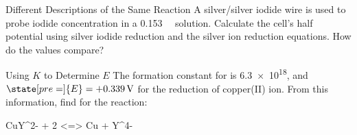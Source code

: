 \documentclass[notes=show]{beamer}
\begin{document}

%

\begin{frame}[t]{Different Descriptions of the Same Reaction}
	A silver/silver iodide wire is used to probe iodide concentration in a
	\SI{0.153}{\milli\Molar}  solution.  Calculate the cell's half
	potential  using silver iodide reduction and the silver ion reduction
	equations.  How do the values compare?

\end{frame}

\clearpage

\begin{frame}[t]{Using $K$ to Determine $E$}
	The formation constant for  is \num{6.3e18}, and
	$\state[pre=]{E} = \SI[retain-explicit-plus]{+0.339}{\volt}$
	for the reduction of copper(II) ion.  From this information, find
	 for the reaction:
	\begin{reaction*}
		CuY^{2-}  +  2 \el{}  <=>  Cu\sld{}  +  Y^{4-}
	\end{reaction*}

\end{frame}
\end{document}
